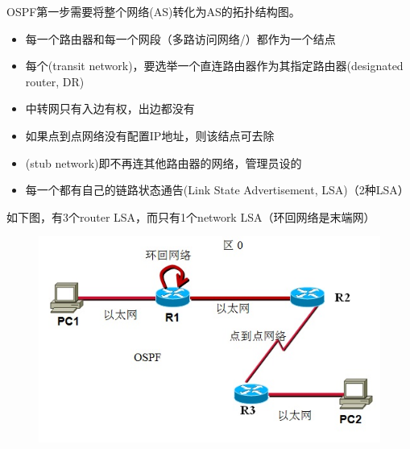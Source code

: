 \myhline
OSPF第一步需要将整个网络(AS)转化为AS的拓扑结构图。
\begin{itemize}
	\item 每一个路由器和每一个网段（多路访问网络/）都作为一个结点
	\item 每个(transit network)，要选举一个直连路由器作为其指定路由器(designated router, DR)
	\item 中转网只有入边有权，出边都没有
	\item 如果点到点网络没有配置IP地址，则该结点可去除
	\item {}(stub network)即不再连其他路由器的网络，管理员设的
	\item 每一个都有自己的链路状态通告(Link State Advertisement, LSA)（2种LSA）
\end{itemize}
\begin{example}
	如下图，有3个router LSA，而只有1个network LSA（环回网络是末端网）
\begin{figure}[H]
	\centering
	\includegraphics[width=0.45\linewidth]{fig/ospf_lsa.jpg}
\end{figure}
\end{example}

